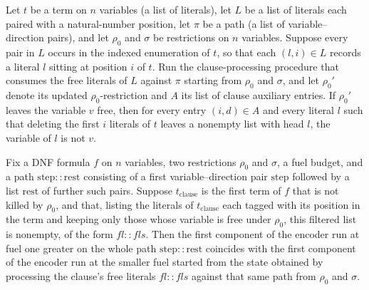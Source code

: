 \begin{lemma}
\label{SwitchingLemma.processClauseLits_aux_ne_of_pcl_none}
\leanok
{}
Let $t$ be a term on $n$ variables (a list of literals), let $L$ be a list of literals
each paired with a natural-number position, let $\pi$ be a path (a list of
variable–direction pairs), and let $\rho_0$ and $\sigma$ be restrictions on $n$
variables. Suppose every pair in $L$ occurs in the indexed enumeration of $t$, so that
each $(l,i)\in L$ records a literal $l$ sitting at position $i$ of $t$. Run the
clause-processing procedure that consumes the free literals of $L$ against $\pi$
starting from $\rho_0$ and $\sigma$, and let $\rho_0'$ denote its updated
$\rho_0$-restriction and $A$ its list of clause auxiliary entries. If $\rho_0'$ leaves
the variable $v$ free, then for every entry $(i,d)\in A$ and every literal $l$ such that
deleting the first $i$ literals of $t$ leaves a nonempty list with head $l$, the
variable of $l$ is not $v$.
\end{lemma}

\begin{lemma}
\label{SwitchingLemma.encode_go_fst_eq_rec}
\leanok
{}
Fix a DNF formula $f$ on $n$ variables, two restrictions $\rho_0$ and $\sigma$, a fuel
budget, and a path $\mathrm{step} :: \mathrm{rest}$ consisting of a first
variable–direction pair $\mathrm{step}$ followed by a list $\mathrm{rest}$ of further
such pairs. Suppose $t_{\mathrm{clause}}$ is the first term of $f$ that is not killed by
$\rho_0$, and that, listing the literals of $t_{\mathrm{clause}}$ each tagged with its
position in the term and keeping only those whose variable is free under $\rho_0$, this
filtered list is nonempty, of the form $\mathit{fl} :: \mathit{fls}$. Then the first
component of the encoder run at fuel one greater on the whole path $\mathrm{step} ::
\mathrm{rest}$ coincides with the first component of the encoder run at the smaller fuel
started from the state obtained by processing the clause's free literals $\mathit{fl} ::
\mathit{fls}$ against that same path from $\rho_0$ and $\sigma$.
\end{lemma}

